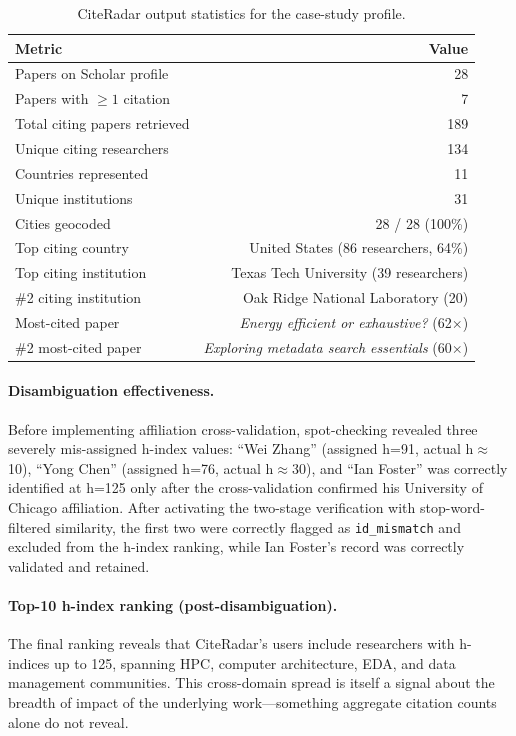 \documentclass[11pt]{article}
\begin{document}
\begin{table}[H]
\centering
\caption{CiteRadar output statistics for the case-study profile.}
\label{tab:stats}
\begin{tabular}{lr}
\toprule
Metric & Value \\
\midrule
Papers on Scholar profile & 28 \\
Papers with $\geq 1$ citation & 7 \\
Total citing papers retrieved & 189 \\
\midrule
Unique citing researchers & 134 \\
Countries represented & 11 \\
Unique institutions & 31 \\
Cities geocoded & 28 / 28 (100\%) \\
\midrule
Top citing country & United States (86 researchers, 64\%) \\
Top citing institution & Texas Tech University (39 researchers) \\
\#2 citing institution & Oak Ridge National Laboratory (20) \\
\midrule
Most-cited paper & \textit{Energy efficient or exhaustive?} (62$\times$) \\
\#2 most-cited paper & \textit{Exploring metadata search essentials} (60$\times$) \\
\bottomrule
\end{tabular}
\end{table}

\paragraph{Disambiguation effectiveness.}
Before implementing affiliation cross-validation, spot-checking revealed
three severely mis-assigned h-index values:
``Wei Zhang'' (assigned h=91, actual h$\approx$10),
``Yong Chen'' (assigned h=76, actual h$\approx$30), and
``Ian Foster'' was correctly identified at h=125 only after the
cross-validation confirmed his University of Chicago affiliation.
After activating the two-stage verification with stop-word-filtered
similarity, the first two were correctly flagged as \texttt{id\_mismatch}
and excluded from the h-index ranking, while Ian Foster's record was
correctly validated and retained.

\paragraph{Top-10 h-index ranking (post-disambiguation).}
The final ranking reveals that CiteRadar's users include researchers with
h-indices up to 125, spanning HPC, computer architecture, EDA, and
data management communities.
This cross-domain spread is itself a signal about the breadth of impact
of the underlying work—something aggregate citation counts alone do not reveal.
\end{document}
